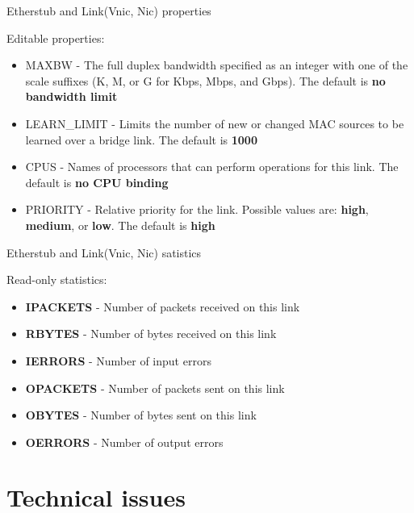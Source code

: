 \documentclass{beamer}
\begin{document}
		\begin{frame}{Etherstub and Link(Vnic, Nic) properties }

			Editable properties:
			
			\begin{itemize}

				\item MAXBW - The full duplex bandwidth specified as an integer with one of the scale suffixes (K, M, or G for Kbps, Mbps, and Gbps). The default is \textbf{no bandwidth limit}
				\item LEARN\_LIMIT - Limits the number of new or changed MAC sources to be learned over a bridge link. The default is \textbf{1000}
				\item CPUS - Names of processors that can perform operations for this link. The default is \textbf{no CPU binding}
				\item PRIORITY - Relative priority for the link. Possible values are: \textbf{high}, \textbf{medium}, or \textbf{low}. The default is \textbf{high}
			
			\end{itemize}

		\end{frame}

		\begin{frame}{Etherstub and Link(Vnic, Nic) satistics }

			Read-only statistics:
			
			\begin{itemize}

				\item \textbf{IPACKETS} - Number of packets received on this link
				\item \textbf{RBYTES} - Number of bytes received on this link
				\item \textbf{IERRORS} - Number of input errors
				\item \textbf{OPACKETS} - Number of packets sent on this link
				\item \textbf{OBYTES} - Number of bytes sent on this link
				\item \textbf{OERRORS} - Number of output errors
			
			\end{itemize}

		\end{frame}

\section{Technical issues}
\end{document}
